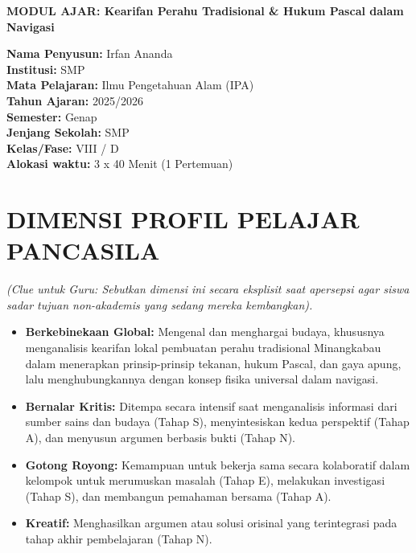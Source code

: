 \documentclass[12pt,a4paper]{article}
\begin{document}
\begin{center}
\textbf{\Large MODUL AJAR: Kearifan Perahu Tradisional \& Hukum Pascal dalam Navigasi}
\end{center}

\vspace{0.5cm}

\begin{tcolorbox}[mystyle]
\textbf{Nama Penyusun:} Irfan Ananda \\
\textbf{Institusi:} SMP \\
\textbf{Mata Pelajaran:} Ilmu Pengetahuan Alam (IPA) \\
\textbf{Tahun Ajaran:} 2025/2026 \\
\textbf{Semester:} Genap \\
\textbf{Jenjang Sekolah:} SMP \\
\textbf{Kelas/Fase:} VIII / D \\
\textbf{Alokasi waktu:} 3 x 40 Menit (1 Pertemuan)
\end{tcolorbox}

\section{DIMENSI PROFIL PELAJAR PANCASILA}
\textit{(Clue untuk Guru: Sebutkan dimensi ini secara eksplisit saat apersepsi agar siswa sadar tujuan non-akademis yang sedang mereka kembangkan).}

\begin{itemize}
\item \textbf{Berkebinekaan Global:} Mengenal dan menghargai budaya, khususnya menganalisis kearifan lokal pembuatan perahu tradisional Minangkabau dalam menerapkan prinsip-prinsip tekanan, hukum Pascal, dan gaya apung, lalu menghubungkannya dengan konsep fisika universal dalam navigasi.
\item \textbf{Bernalar Kritis:} Ditempa secara intensif saat menganalisis informasi dari sumber sains dan budaya (Tahap S), menyintesiskan kedua perspektif (Tahap A), dan menyusun argumen berbasis bukti (Tahap N).
\item \textbf{Gotong Royong:} Kemampuan untuk bekerja sama secara kolaboratif dalam kelompok untuk merumuskan masalah (Tahap E), melakukan investigasi (Tahap S), dan membangun pemahaman bersama (Tahap A).
\item \textbf{Kreatif:} Menghasilkan argumen atau solusi orisinal yang terintegrasi pada tahap akhir pembelajaran (Tahap N).
\end{itemize}
\end{document}
